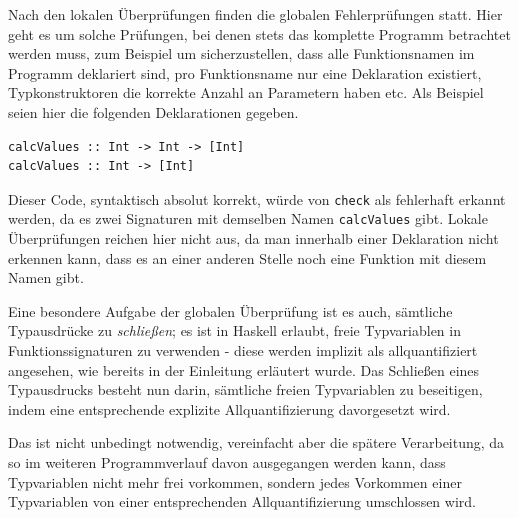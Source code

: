Nach den lokalen Überprüfungen finden die globalen Fehlerprüfungen statt. Hier geht es um solche Prüfungen, bei denen stets das
komplette Programm betrachtet werden muss, zum Beispiel um sicherzustellen, dass alle Funktionsnamen im Programm deklariert sind,
pro Funktionsname nur eine Deklaration existiert, Typkonstruktoren die korrekte Anzahl an Parametern haben etc.
Als Beispiel seien hier die folgenden Deklarationen gegeben.

\begin{verbatim}
calcValues :: Int -> Int -> [Int]
calcValues :: Int -> [Int]
\end{verbatim}

Dieser Code, syntaktisch absolut korrekt, würde von \texttt{check} als fehlerhaft erkannt werden, da es zwei Signaturen mit
demselben Namen \texttt{calcValues} gibt. Lokale Überprüfungen reichen hier nicht aus, da man innerhalb einer Deklaration
nicht erkennen kann, dass es an einer anderen Stelle noch eine Funktion mit diesem Namen gibt.

Eine besondere Aufgabe der globalen Überprüfung ist es auch, sämtliche Typausdrücke zu \textit{schließen}; es ist in Haskell
erlaubt, freie Typvariablen in Funktionssignaturen zu verwenden - diese werden implizit als allquantifiziert angesehen, wie bereits
in der Einleitung erläutert wurde.
Das Schließen eines Typausdrucks besteht nun darin, sämtliche freien Typvariablen zu beseitigen, indem eine entsprechende
explizite Allquantifizierung davorgesetzt wird.

Das ist nicht unbedingt notwendig, vereinfacht aber die spätere Verarbeitung, da so im weiteren Programmverlauf davon ausgegangen
werden kann, dass Typvariablen nicht mehr frei vorkommen, sondern jedes Vorkommen einer Typvariablen von einer entsprechenden
Allquantifizierung umschlossen wird.



